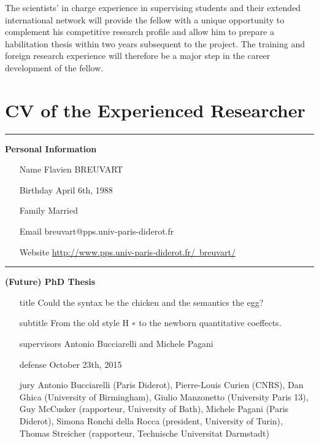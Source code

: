 \documentclass{article}[11pt]
\begin{document}
The scientists’ in charge experience in supervising students and their extended international network will provide the fellow with a unique opportunity to complement his competitive research profile and allow him to prepare a habilitation thesis within two years subsequent to the project. The training and foreign research experience will therefore be a major step in the career development of the fellow.


\newpage

\section{CV of the Experienced Researcher}

\newcommand\entry[5]{\item[#1]{\bf #2} #3 {\em #4} #5}

\noindent \rule{5.5em}{7pt} {\large \bf Personal Information} \nobreak
\begin{itemize}[itemindent=0em,leftmargin=6em, labelsep=1em]
\item[Name] Flavien BREUVART
\item[Birthday] April 6th, 1988
\item[Family] Married 
\item[Email] breuvart@pps.univ-paris-diderot.fr
\item[Website] \href{http://www.pps.univ-paris-diderot.fr/~breuvart/}{http://www.pps.univ-paris-diderot.fr/~breuvart/}
\end{itemize}

\noindent \rule{5.5em}{7pt} {\large \bf (Future) PhD Thesis} \nobreak
\begin{itemize}[itemindent=0em,leftmargin=6em, labelsep=1em]
\item[title]{Could the syntax be the chicken and the semantics the egg?}
\item[subtitle]{From the old style H ∗ to the newborn quantitative coeffects.}
\item[supervisors]{Antonio Bucciarelli and Michele Pagani}
\item[defense]{October 23th, 2015}
\item[jury]{Antonio Bucciarelli (Paris Diderot), Pierre-Louis Curien (CNRS), Dan Ghica (University of Birmingham), Giulio Manzonetto (University Paris 13), Guy McCusker (rapporteur, University of Bath), Michele Pagani (Paris Diderot), Simona Ronchi della Rocca (president, University of Turin), Thomas Streicher (rapporteur, Technische Universitat Darmstadt)}
\end{itemize}
\end{document}
